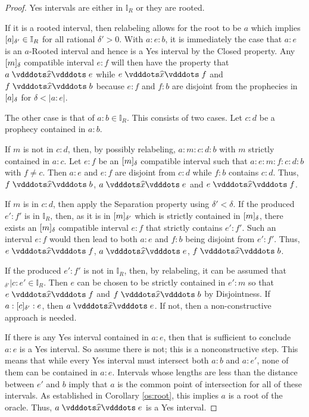 \documentclass[12pt]{article}
\begin{document}
\begin{proof}
    Yes intervals are either in $\mathbb{I}_R$ or they are rooted. 
    
    If it is a rooted interval, then relabeling allows for the root to be $a$ which implies $\halo[\delta']{a} \in \mathbb{I}_R$ for all rational $\delta' >0$. With $a:e:b$, it is immediately the case that $a:e$ is an $a$-Rooted interval and hence is a Yes interval by the Closed property. Any $\halo{m}$ compatible interval $e:f$ will then have the property that $a \xora e$ while \sout{$e\xora f$} and \sout{$f\xora b$} because $e:f$ and $f:b$ are disjoint from the prophecies in $\halo{a}$ for $\delta < |a:e|$.
 
    The other case is that of $a:b \in \mathbb{I}_R$. This consists of two cases. Let $c:d$ be a prophecy contained in $a:b$. 
    
    If $m$ is not in $c:d$, then, by possibly relabeling, $a:m:c:d:b$ with $m$ strictly contained in $a:c$.  Let $e:f$ be an $\halo{m}$ compatible interval such that $a:e:m:f:c:d:b$ with $f \neq c$. Then $a:e$ and $e:f$ are disjoint from $c:d$ while $f:b$ contains $c:d$. Thus, $f \xora b$, \sout{$a\xora e$} and \sout{$e\xora f$}.

    If $m$ is in $c:d$, then apply the Separation property using  $\delta' < \delta$. If the produced $e':f'$ is in $\mathbb{I}_R$, then, as it is in $\halo[\delta']{m}$ which is strictly contained in $\halo{m}$, there exists an $\halo{m}$ compatible interval $e:f$ that strictly contains $e':f'$. Such an interval $e:f$ would then lead to both $a:e$ and $f:b$ being disjoint from $e':f'$. Thus, $e \xora f$, \sout{$a\xora e$}, \sout{$f\xora b$}.

    If the produced $e':f'$ is not in $\mathbb{I}_R$, then, by relabeling, it can be assumed that ${}_{\delta'} |c:e' \in \mathbb{I}_R$. Then $e$ can be chosen to be strictly contained in $e':m$ so that \sout{$e\xora f$} and \sout{$f\xora b$} by Disjointness. If $a:\halo[\delta']{c}:e$, then $a \xora e$. If not, then a non-constructive approach is needed.

    If there is any Yes interval contained in $a:e$, then that is sufficient to conclude $a:e$ is a Yes interval. So assume there is not; this is a nonconstructive step. This means that while every Yes interval must intersect both $a:b$ and $a:e'$, none of them can be contained in $a:e$. Intervals whose lengths are less than the distance between $e'$ and $b$ imply that $a$ is the common point of intersection for all of these intervals. As established in Corollary \ref{os:root}, this implies $a$ is a root of the oracle. Thus, $a \xora e$ is a Yes interval. 

\end{proof}
\end{document}
